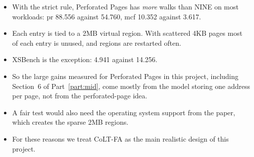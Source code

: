 \begin{itemize}
    \item With the strict rule, Perforated Pages has \emph{more} walks than NINE on most workloads: pr 88.556 against 54.760, mcf 10.352 against 3.617.
    \item Each entry is tied to a 2MB virtual region. With scattered 4KB pages most of each entry is unused, and regions are restarted often.
    \item XSBench is the exception: 4.941 against 14.256.
    \item So the large gains measured for Perforated Pages in this project, including Section~6 of Part~\ref{part:mid}, come mostly from the model storing one address per page, not from the perforated-page idea.
    \item A fair test would also need the operating system support from the paper, which creates the sparse 2MB regions.
    \item For these reasons we treat CoLT-FA as the main realistic design of this project.
\end{itemize}


